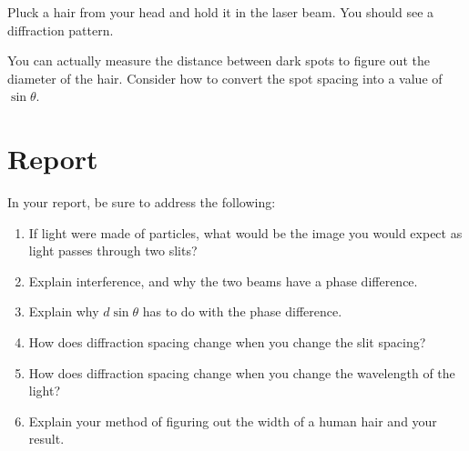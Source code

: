 \documentclass[phy1200]{handout}
\begin{document}
Pluck a hair from your head and hold it in the laser beam. You should see a diffraction pattern. 

You can actually measure the distance between dark spots to figure out the diameter of the hair. Consider how to convert the spot spacing into a value of $\sin\theta$. 

\section{Report}
In your report, be sure to address the following:
\begin{enumerate}
    \item If light were made of particles, what would be the image you would expect as light passes through two slits?
    \item Explain interference, and why the two beams have a phase difference. 
    \item Explain why $d\sin\theta$ has to do with the phase difference.
    \item How does diffraction spacing change when you change the slit spacing?
    \item How does diffraction spacing change when you change the wavelength of the light?
    \item Explain your method of figuring out the width of a human hair and your result.
\end{enumerate}
\end{document}
